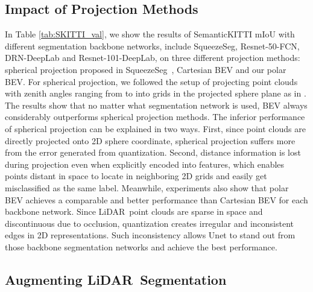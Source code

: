 \documentclass[10pt,twocolumn,letterpaper]{article}
\newcommand{\lidar}{\mbox{LiDAR }}
\begin{document}
\subsection{Impact of Projection Methods}

 In Table \ref{tab:SKITTI_val}, we show the results of SemanticKITTI mIoU with different segmentation backbone networks, include SqueezeSeg, Resnet-50-FCN, DRN-DeepLab and Resnet-101-DeepLab, on three different projection methods: spherical projection proposed in SqueezeSeg~\cite{wu2018squeezeseg}, Cartesian BEV and our polar BEV. For spherical projection, we followed the setup of projecting point clouds with zenith angles ranging from  to  into  grids in the projected sphere plane as in \cite{milioto2019rangenet++}. The results show that no matter what segmentation network is used, BEV always considerably outperforms spherical projection methods. The inferior performance of spherical projection can be explained in two ways. First, since point clouds are directly projected onto 2D sphere coordinate, spherical projection suffers more from the error generated from quantization. Second, distance information is lost during projection even when explicitly encoded into features, which enables points distant in space to locate in neighboring 2D grids and easily get misclassified as the same label. Meanwhile, experiments also show that polar BEV achieves a comparable and better performance than Cartesian BEV for each backbone network. Since \lidar point clouds are sparse in space and discontinuous due to occlusion, quantization creates irregular and inconsistent edges in 2D representations. Such inconsistency allows Unet to stand out from those backbone segmentation networks and achieve the best performance.







\subsection{Augmenting \lidar Segmentation}
\end{document}

